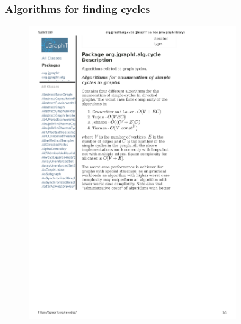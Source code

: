 \documentclass{beamer}
\begin{document}
\begin{frame}
  \frametitle{Algorithms for finding cycles}
  \begin{figure}
    \includegraphics[width=0.8\textwidth]{jgrapht.pdf}
  \end{figure}
\end{frame}
\end{document}
